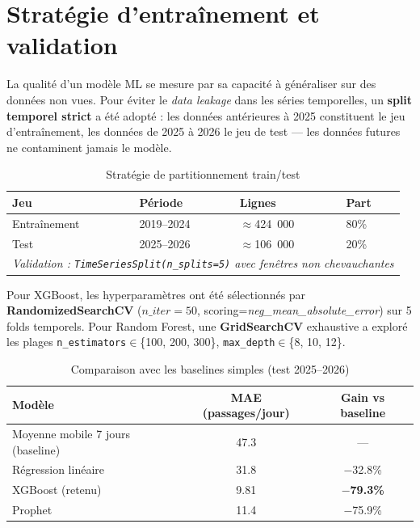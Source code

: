 \documentclass[12pt,a4paper]{report}
\begin{document}
	\section{Stratégie d'entraînement et validation}
	
	La qualité d'un modèle ML se mesure par sa capacité à généraliser sur des données non
	vues. Pour éviter le \textit{data leakage} dans les séries temporelles, un
	\textbf{split temporel strict} a été adopté : les données antérieures à 2025 constituent
	le jeu d'entraînement, les données de 2025 à 2026 le jeu de test — les données futures ne
	contaminent jamais le modèle.
	
	\begin{table}[H]
		\centering
		\caption{Stratégie de partitionnement train/test}
		\renewcommand{\arraystretch}{1.2}
		\begin{tabular}{llll}
			\toprule
			\textbf{Jeu} & \textbf{Période} & \textbf{Lignes} & \textbf{Part} \\
			\midrule
			Entraînement & 2019--2024 & $\approx$424~000 & 80\% \\
			Test         & 2025--2026 & $\approx$106~000 & 20\% \\
			\midrule
			\multicolumn{4}{l}{\textit{Validation : \texttt{TimeSeriesSplit(n\_splits=5)} avec fenêtres non chevauchantes}} \\
			\bottomrule
		\end{tabular}
	\end{table}
	
	Pour XGBoost, les hyperparamètres ont été sélectionnés par \textbf{RandomizedSearchCV}
	($n\_iter=50$, scoring=\textit{neg\_mean\_absolute\_error}) sur 5 folds temporels.
	Pour Random Forest, une \textbf{GridSearchCV} exhaustive a exploré les plages
	\texttt{n\_estimators}$\in$\{100, 200, 300\}, \texttt{max\_depth}$\in$\{8, 10, 12\}.
	
	\begin{table}[H]
		\centering
		\caption{Comparaison avec les baselines simples (test 2025--2026)}
		\renewcommand{\arraystretch}{1.2}
		\begin{tabular}{lcc}
			\toprule
			\textbf{Modèle} & \textbf{MAE (passages/jour)} & \textbf{Gain vs baseline} \\
			\midrule
			Moyenne mobile 7 jours (baseline) & 47.3 & — \\
			Régression linéaire              & 31.8 & $-$32.8\% \\
			XGBoost (retenu)                 & 9.81 & \textbf{$-$79.3\%} \\
			Prophet                          & 11.4 & $-$75.9\% \\
			\bottomrule
		\end{tabular}
	\end{table}
	
\end{document}
